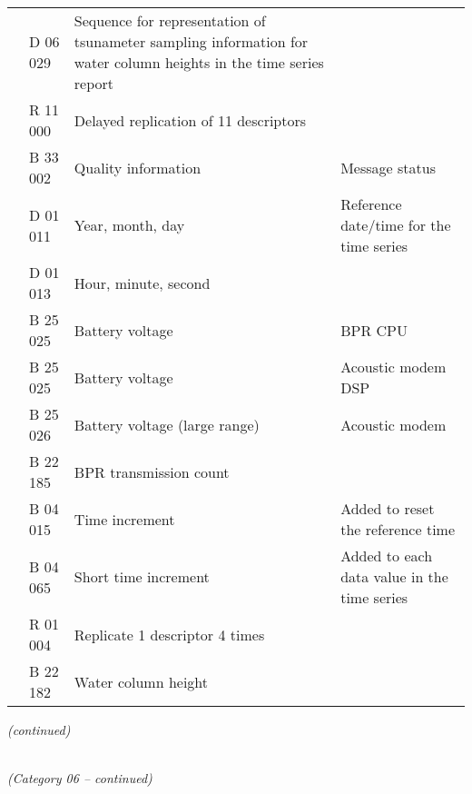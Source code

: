 \begin{longtable}[]{@{}llll@{}}
& D 06 029 & Sequence for representation of tsunameter sampling information for water column heights in the time series report &\tabularnewline
& R 11 000 & Delayed replication of 11 descriptors &\tabularnewline
& B 33 002 & Quality information & Message status\tabularnewline
& D 01 011 & Year, month, day & Reference date/time for the time series\tabularnewline
& D 01 013 & Hour, minute, second &\tabularnewline
& B 25 025 & Battery voltage & BPR CPU\tabularnewline
& B 25 025 & Battery voltage & Acoustic modem DSP\tabularnewline
& B 25 026 & Battery voltage (large range) & Acoustic modem\tabularnewline
& B 22 185 & BPR transmission count &\tabularnewline
& B 04 015 & Time increment & Added to reset the reference time\tabularnewline
& B 04 065 & Short time increment & Added to each data value in the time series\tabularnewline
& R 01 004 & Replicate 1 descriptor 4 times &\tabularnewline
& B 22 182 & Water column height &\tabularnewline
\bottomrule
\end{longtable}

\emph{(continued)}

\emph{\\
(Category 06 -- continued)}

